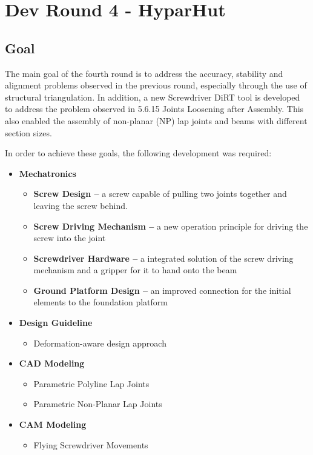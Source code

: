 \chapter{Dev Round 4 - HyparHut}

\section{Goal}
The main goal of the fourth round is to address the accuracy, stability and alignment problems observed in the previous round, especially through the use of structural triangulation. In addition, a new Screwdriver DiRT tool is developed to address the problem observed in 5.6.15 Joints Loosening after Assembly. This also enabled the assembly of non-planar (NP) lap joints and beams with different section sizes. 

In order to achieve these goals, the following development was required:
\begin{itemize}
    \item \textbf{Mechatronics}
    \begin{itemize}
        \item \textbf{Screw Design --} a screw capable of pulling two joints together and leaving the screw behind.
        \item \textbf{Screw Driving Mechanism --} a new operation principle for driving the screw into the joint
        \item \textbf{Screwdriver Hardware --} a integrated solution of the screw driving mechanism and a gripper for it to hand onto the beam
        \item \textbf{Ground Platform Design --} an improved connection for the initial elements to the foundation platform
    \end{itemize}
    \item \textbf{Design Guideline}
    \begin{itemize}
        \item Deformation-aware design approach
    \end{itemize}
    \item \textbf{CAD Modeling}
    \begin{itemize}
        \item Parametric Polyline Lap Joints
    \end{itemize}
    \begin{itemize}
        \item Parametric Non-Planar Lap Joints
    \end{itemize}
    \item \textbf{CAM Modeling}
    \begin{itemize}
        \item Flying Screwdriver Movements
    \end{itemize}
\end{itemize}
